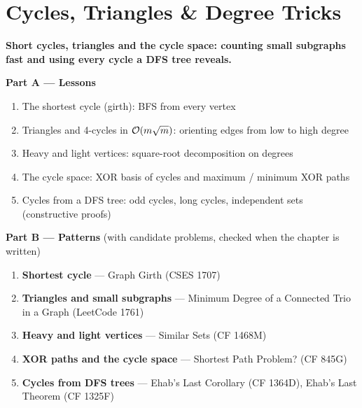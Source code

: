 \chapter{Cycles, Triangles \& Degree Tricks}
\label{ch:cycles}

\begin{tcolorbox}[enhanced, colback=white, colframe=secondaryblue, boxrule=1pt, arc=2mm]
\textbf{\large\textcolor{primaryblue}{Short cycles, triangles and the cycle space: counting small subgraphs fast and using every cycle a DFS tree reveals.}}
\end{tcolorbox}


\begin{plannedbox}
\textbf{Part A --- Lessons}
\begin{enumerate}[leftmargin=*, label=\textbf{A\arabic*.}, itemsep=1pt]
    \item The shortest cycle (girth): BFS from every vertex
    \item Triangles and 4-cycles in $\mathcal{O}(m\sqrt{m})$: orienting edges from low to high degree
    \item Heavy and light vertices: square-root decomposition on degrees
    \item The cycle space: XOR basis of cycles and maximum / minimum XOR paths
    \item Cycles from a DFS tree: odd cycles, long cycles, independent sets (constructive proofs)
\end{enumerate}
\textbf{Part B --- Patterns} (with candidate problems, checked when the chapter is written)
\begin{enumerate}[leftmargin=*, label=\textbf{P\arabic*.}, itemsep=1pt]
    \item \textbf{Shortest cycle} --- Graph Girth {\small\color{darkgray}(CSES 1707)}
    \item \textbf{Triangles and small subgraphs} --- Minimum Degree of a Connected Trio in a Graph {\small\color{darkgray}(LeetCode 1761)}
    \item \textbf{Heavy and light vertices} --- Similar Sets {\small\color{darkgray}(CF 1468M)}
    \item \textbf{XOR paths and the cycle space} --- Shortest Path Problem? {\small\color{darkgray}(CF 845G)}
    \item \textbf{Cycles from DFS trees} --- Ehab's Last Corollary {\small\color{darkgray}(CF 1364D)}, Ehab's Last Theorem {\small\color{darkgray}(CF 1325F)}
\end{enumerate}
\end{plannedbox}
